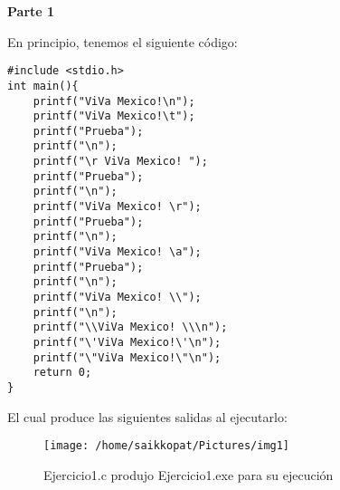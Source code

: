 \documentclass[a4paper,12pt]{report}
\begin{document}
\vspace{1cm}

\textbf{Parte 1}\\

\vspace{1cm}

En principio, tenemos el siguiente código:\\

\vspace{0.5cm}

\begin{lstlisting}
#include <stdio.h>
int main(){
	printf("ViVa Mexico!\n");
	printf("ViVa Mexico!\t");
	printf("Prueba");
	printf("\n");
	printf("\r ViVa Mexico! ");
	printf("Prueba");
	printf("\n");
	printf("ViVa Mexico! \r");
	printf("Prueba");
	printf("\n");
	printf("ViVa Mexico! \a");
	printf("Prueba");
	printf("\n");
	printf("ViVa Mexico! \\");
	printf("\n");
	printf("\\ViVa Mexico! \\\n");
	printf("\'ViVa Mexico!\'\n");
	printf("\"ViVa Mexico!\"\n");
	return 0;
}
\end{lstlisting}

\vspace{0.5cm}

El cual produce las siguientes salidas al ejecutarlo:\\

\vspace{0.5cm}

\begin{figure}[htp]
	\centering
	\texttt{[image: /home/saikkopat/Pictures/img1]}
	\caption{Ejercicio1.c produjo Ejercicio1.exe para su ejecución}
\end{figure}

\vspace{1cm}
\end{document}
